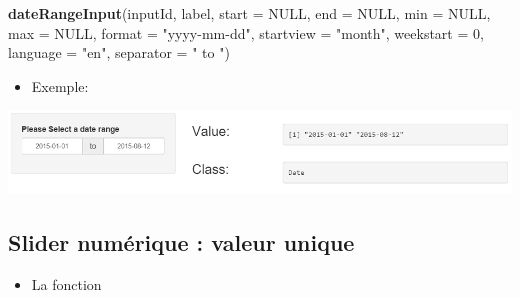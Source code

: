 \documentclass[]{article}
\newenvironment{Shaded}{\begin{snugshade}}{\end{snugshade}}
\newcommand{\KeywordTok}[1]{\textcolor[rgb]{0.13,0.29,0.53}{\textbf{#1}}}
\newcommand{\DataTypeTok}[1]{\textcolor[rgb]{0.13,0.29,0.53}{#1}}
\newcommand{\DecValTok}[1]{\textcolor[rgb]{0.00,0.00,0.81}{#1}}
\newcommand{\StringTok}[1]{\textcolor[rgb]{0.31,0.60,0.02}{#1}}
\newcommand{\CommentTok}[1]{\textcolor[rgb]{0.56,0.35,0.01}{\textit{#1}}}
\newcommand{\OtherTok}[1]{\textcolor[rgb]{0.56,0.35,0.01}{#1}}
\newcommand{\NormalTok}[1]{#1}
\providecommand{\tightlist}{%
  \setlength{\itemsep}{0pt}\setlength{\parskip}{0pt}}
\begin{document}
\begin{Shaded}
\begin{Highlighting}[]
\KeywordTok{dateRangeInput}\NormalTok{(inputId, label, }\DataTypeTok{start =} \OtherTok{NULL}\NormalTok{, }\DataTypeTok{end =} \OtherTok{NULL}\NormalTok{, }\DataTypeTok{min =} \OtherTok{NULL}\NormalTok{, }\DataTypeTok{max =} \OtherTok{NULL}\NormalTok{,}
               \DataTypeTok{format =} \StringTok{"yyyy-mm-dd"}\NormalTok{, }\DataTypeTok{startview =} \StringTok{"month"}\NormalTok{, }\DataTypeTok{weekstart =} \DecValTok{0}\NormalTok{,}
               \DataTypeTok{language =} \StringTok{"en"}\NormalTok{, }\DataTypeTok{separator =} \StringTok{" to "}\NormalTok{)}
\end{Highlighting}
\end{Shaded}

\begin{itemize}
\tightlist
\item
  Exemple:
\end{itemize}

\begin{Shaded}
\end{Shaded}

\includegraphics{img/date_range.png}

\subsection{Slider numérique : valeur
unique}\label{slider-numerique-valeur-unique}

\begin{itemize}
\tightlist
\item
  La fonction
\end{itemize}
\end{document}
